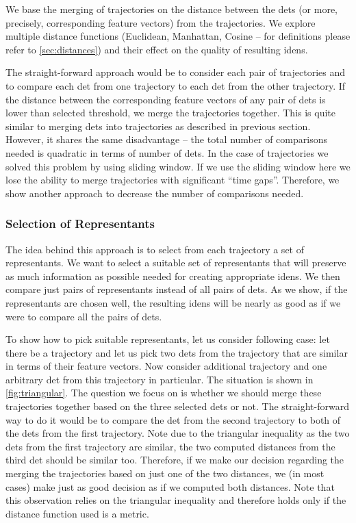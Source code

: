 We base the merging of trajectories on the distance between the \glspl{det} (or more, precisely, corresponding feature vectors) from the trajectories. We explore multiple distance functions (Euclidean, Manhattan, Cosine -- for definitions please refer to \autoref{sec:distances}) and their effect on the quality of resulting \glspl{iden}.

The straight-forward approach would be to consider each pair of trajectories and to compare each \gls{det} from one trajectory to each \gls{det} from the other trajectory. If the distance between the corresponding feature vectors of any pair of \glspl{det} is lower than selected threshold, we merge the trajectories together. This is quite similar to merging \glspl{det} into trajectories as described in previous section. However, it shares the same disadvantage -- the total number of comparisons needed is quadratic in terms of number of \glspl{det}. In the case of trajectories we solved this problem by using sliding window. If we use the sliding window here we lose the ability to merge trajectories with significant ``time gaps''. Therefore, we show another approach to decrease the number of comparisons needed.


\subsubsection{Selection of Representants}


The idea behind this approach is to select from each trajectory a set of representants. We want to select a suitable set of representants that will preserve as much information as possible needed for creating appropriate \glspl{iden}. We then compare just pairs of representants instead of all pairs of \glspl{det}. As we show, if the representants are chosen well, the resulting \glspl{iden} will be nearly as good as if we were to compare all the pairs of \glspl{det}.

To show how to pick suitable representants, let us consider following case: let there be a trajectory and let us pick two \glspl{det} from the trajectory that are similar in terms of their feature vectors. Now consider additional trajectory and one arbitrary \gls{det} from this trajectory in particular. The situation is shown in \autoref{fig:triangular}. The question we focus on is whether we should merge these trajectories together based on the three selected \glspl{det} or not. The straight-forward way to do it would be to compare the \gls{det} from the second trajectory to both of the \glspl{det} from the first trajectory. Note due to the triangular inequality as the two \glspl{det} from the first trajectory are similar, the two computed distances from the third \gls{det} should be similar too. Therefore, if we make our decision regarding the merging the trajectories based on just one of the two distances, we (in most cases) make just as good decision as if we computed both distances. Note that this observation relies on the triangular inequality and therefore holds only if the distance function used is a metric.

